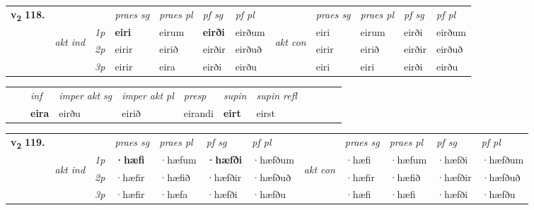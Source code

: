 \begin{tabular}{llllllllllll} \toprule
\multirow{4}{*}{{{\textbf{v{\textsubscript{2}}} \Large{\textbf{118.}}}}}  & &   &  \textit{praes sg}  & \textit{praes pl}  &\textit{ pf sg} & \textit{pf pl} &  &  \textit{praes sg}  & \textit{praes pl}  & \textit{pf sg} & \textit{pf pl } \\*
	\cmidrule{4-7} \cmidrule{9-12}
 & \multirow{3}{*}{\begin{turn}{90}\textit{akt ind}\end{turn}} & {\textit{1p}} & \textbf{eiri} & eirum    & \textbf{eirði} & eirðum & \multirow{3}{*}{\begin{turn}{90}\textit{akt con}\end{turn}} &eiri & eirum & eirði & eirðum\\*
& &  {\textit{2p}} &  eirir  & eirið   & eirðir & eirðuð & & eirir & eirið & eirðir & eirðuð \\*
& &  {\textit{3p}} & eirir & eira   & eirði & eirðu & & eiri & eiri& eirði & eirðu  \\*
\cmidrule{4-7} \cmidrule{9-12}
\end{tabular}


\begin{tabular}{llllllllllll}
 & & \textit{inf} & \textit{imper akt sg} & \textit{imper akt pl}   & \textit{presp} & \textit{supin} & \textit{supin refl}      \\*
  & & \textbf{eira} & eirðu  & eirið   & eirandi &  \textbf{eirt} & eirst  \\*
\cmidrule{1-12}
\end{tabular}



\begin{tabular}{llllllllllll} \toprule
\multirow{4}{*}{{{\textbf{v{\textsubscript{2}}} \Large{\textbf{119.}}}}}  & &   &  \textit{praes sg}  & \textit{praes pl}  &\textit{ pf sg} & \textit{pf pl} &  &  \textit{praes sg}  & \textit{praes pl}  & \textit{pf sg} & \textit{pf pl } \\*
	\cmidrule{4-7} \cmidrule{9-12}
 & \multirow{3}{*}{\begin{turn}{90}\textit{akt ind}\end{turn}} & {\textit{1p}} & \textbf{·hæfi} & ·hæfum    & \textbf{·hæfði} & ·hæfðum & \multirow{3}{*}{\begin{turn}{90}\textit{akt con}\end{turn}} &·hæfi & ·hæfum & ·hæfði & ·hæfðum\\*
& &  {\textit{2p}} &  ·hæfir  & ·hæfið   & ·hæfðir & ·hæfðuð & & ·hæfir & ·hæfið & ·hæfðir & ·hæfðuð \\*
& &  {\textit{3p}} & ·hæfir & ·hæfa   & ·hæfði & ·hæfðu & & ·hæfi & ·hæfi& ·hæfði & ·hæfðu  \\*
\cmidrule{4-7} \cmidrule{9-12}
\end{tabular}


